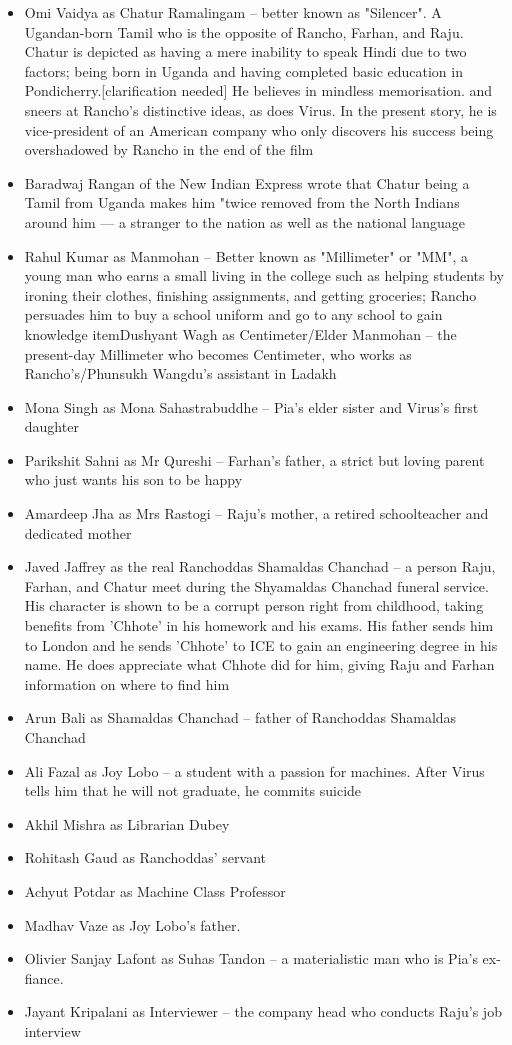 \documentclass{article}
\begin{document}
\begin{itemize}
    \item{Omi Vaidya as Chatur Ramalingam – better known as "Silencer". A Ugandan-born Tamil who is the opposite of Rancho, Farhan, and Raju. Chatur is depicted as having a mere inability to speak Hindi due to two factors; being born in Uganda and having completed basic education in Pondicherry.[clarification needed] He believes in mindless memorisation. and sneers at Rancho's distinctive ideas, as does Virus. In the present story, he is vice-president of an American company who only discovers his success being overshadowed by Rancho in the end of the film}
    \item{Baradwaj Rangan of the New Indian Express wrote that Chatur being a Tamil from Uganda makes him "twice removed from the North Indians around him — a stranger to the nation as well as the national language}
    \item{Rahul Kumar as Manmohan – Better known as "Millimeter" or "MM", a young man who earns a small living in the college such as helping students by ironing their clothes, finishing assignments, and getting groceries; Rancho persuades him to buy a school uniform and go to any school to gain knowledge}
    item{Dushyant Wagh as Centimeter/Elder Manmohan – the present-day Millimeter who becomes Centimeter, who works as Rancho's/Phunsukh Wangdu's assistant in Ladakh}
    \item{Mona Singh as Mona Sahastrabuddhe – Pia's elder sister and Virus's first daughter}
    \item{Parikshit Sahni as Mr Qureshi – Farhan's father, a strict but loving parent who just wants his son to be happy}
    \item{Amardeep Jha as Mrs Rastogi – Raju's mother, a retired schoolteacher and dedicated mother}
    \item{Javed Jaffrey as the real Ranchoddas Shamaldas Chanchad – a person Raju, Farhan, and Chatur meet during the Shyamaldas Chanchad funeral service. His character is shown to be a corrupt person right from childhood, taking benefits from 'Chhote' in his homework and his exams. His father sends him to London and he sends 'Chhote' to ICE to gain an engineering degree in his name. He does appreciate what Chhote did for him, giving Raju and Farhan information on where to find him}
    \item{Arun Bali as Shamaldas Chanchad – father of Ranchoddas Shamaldas Chanchad}
    \item{Ali Fazal as Joy Lobo – a student with a passion for machines. After Virus tells him that he will not graduate, he commits suicide}
    \item{Akhil Mishra as Librarian Dubey}
    \item{Rohitash Gaud as Ranchoddas' servant}
    \item{Achyut Potdar as Machine Class Professor}
    \item{Madhav Vaze as Joy Lobo's father.}
    \item{Olivier Sanjay Lafont as Suhas Tandon – a materialistic man who is Pia's ex-fiance.}
    \item{Jayant Kripalani as Interviewer – the company head who conducts Raju's job interview}
\end{itemize}
\end{document}
